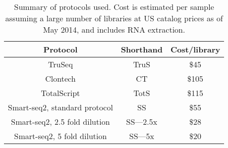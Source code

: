 \begin{table}[htdp]
\caption{Summary of protocols used. Cost is estimated per sample assuming a
     large number of libraries at US catalog prices as of May 2014, and includes RNA extraction.  }
\begin{tabular}{|c|c|c|}\hline
Protocol & Shorthand & Cost/library \\\hline
TruSeq & TruS & \$45 \\
Clontech & CT & \$105 \\
TotalScript & TotS & \$115 \\
Smart-seq2, standard protocol & SS & \$55 \\
Smart-seq2, 2.5 fold dilution & SS---2.5x & \$28 \\
Smart-seq2, 5 fold dilution & SS---5x & \$20 \\
\hline\end{tabular}
\label{tab:protocolcosts}
\end{table}

